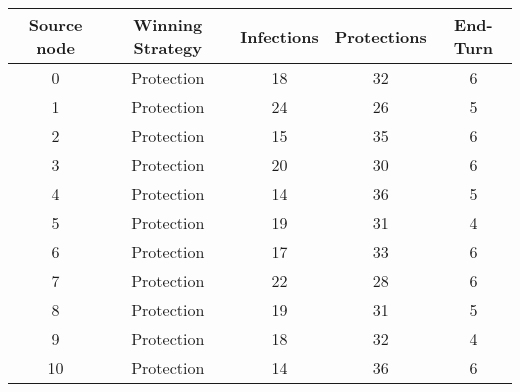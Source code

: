\documentclass[results.tex]{subfiles}
\begin{document}
    \begin{center}
        \begin{tabular}{| c || c | c | c | c |}
            \hline
            {\bfseries Source node} & {\bfseries Winning Strategy} & {\bfseries Infections} & {\bfseries Protections}
            & {\bfseries End-Turn}
            \\  %
            \hline\hline
            0                       & Protection                   & 18                     & 32                      & 6                    \\
            \hline
            1                       & Protection                   & 24                     & 26                      & 5                    \\
            \hline
            2                       & Protection                   & 15                     & 35                      & 6                    \\
            \hline
            3                       & Protection                   & 20                     & 30                      & 6                    \\
            \hline
            4                       & Protection                   & 14                     & 36                      & 5                    \\
            \hline
            5                       & Protection                   & 19                     & 31                      & 4                    \\
            \hline
            6                       & Protection                   & 17                     & 33                      & 6                    \\
            \hline
            7                       & Protection                   & 22                     & 28                      & 6                    \\
            \hline
            8                       & Protection                   & 19                     & 31                      & 5                    \\
            \hline
            9                       & Protection                   & 18                     & 32                      & 4                    \\
            \hline
            10                      & Protection                   & 14                     & 36                      & 6                    \\

\end{tabular}
\end{center}
\end{document}
